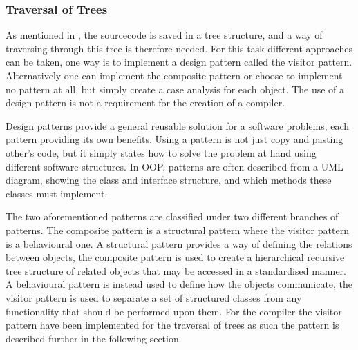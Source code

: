 \subsubsection*{Traversal of Trees}
As mentioned in , the sourcecode is saved in a tree structure, and a way of traversing through this tree is therefore needed.
For this task different approaches can be taken, one way is to implement a design pattern called the visitor pattern.
Alternatively one can implement the composite pattern or choose to implement no pattern at all, but simply create a case analysis for each object.
The use of a design pattern is not a requirement for the creation of a compiler.

Design patterns provide a general reusable solution for a software problems, each pattern providing its own benefits.
Using a pattern is not just copy and pasting other's code, but it simply states how to solve the problem at hand using different software structures.
In OOP, patterns are often described from a UML diagram, showing the class and interface structure, and which methods these classes must implement. 

The two aforementioned patterns are classified under two different branches of patterns.
The composite pattern is a structural pattern where the visitor pattern is a behavioural one.
A structural pattern provides a way of defining the relations between objects, the composite pattern is used to create a hierarchical recursive tree structure of related objects that may be accessed in a standardised manner.
A behavioural pattern is instead used to define how the objects communicate, the visitor pattern is used to separate a set of structured classes from any functionality that should be performed upon them.
For the compiler the visitor pattern have been implemented for the traversal of trees as such the pattern is described further in the following section. 
